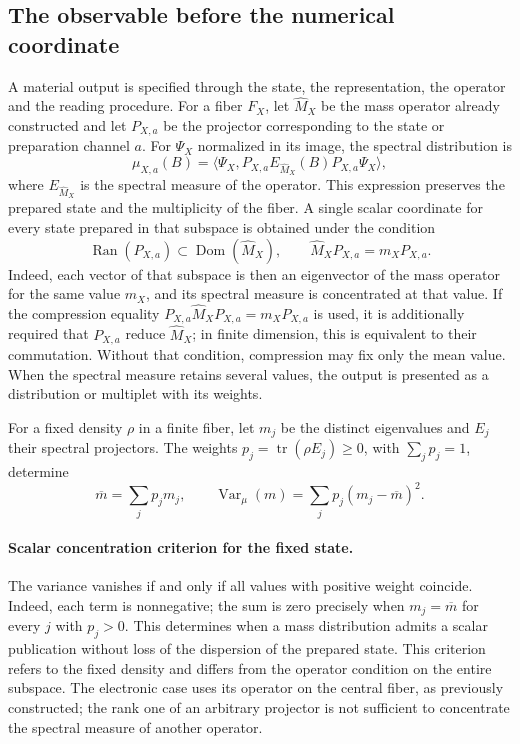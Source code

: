 \subsection{The observable before the numerical coordinate}
\label{vi:subsec:vi-tipos-observable}

A material output is specified through the state, the representation,
the operator and the reading procedure. For a fiber \(F_X\), let
\(\widehat M_X\) be the mass operator already constructed and let \(P_{X,a}\)
be the projector corresponding to the state or preparation channel \(a\).
For \(\Psi_X\) normalized in its image, the spectral distribution is
\[
 \mu_{X,a}(B)
 =\langle\Psi_X,
   P_{X,a}E_{\widehat M_X}(B)P_{X,a}\Psi_X\rangle,
\]
where \(E_{\widehat M_X}\) is the spectral measure of the operator. This
expression preserves the prepared state and the multiplicity of the fiber.
A single scalar coordinate for every state prepared in that subspace
is obtained under the condition
\[
 \operatorname{Ran}(P_{X,a})\subset\operatorname{Dom}(\widehat M_X),
 \qquad \widehat M_XP_{X,a}=m_XP_{X,a}.
\]
Indeed, each vector of that subspace is then an eigenvector of the
mass operator for the same value \(m_X\), and its spectral measure is
concentrated at that value. If the compression equality
\(P_{X,a}\widehat M_XP_{X,a}=m_XP_{X,a}\) is used, it is additionally required that
\(P_{X,a}\) reduce \(\widehat M_X\); in finite dimension, this is equivalent
to their commutation. Without that condition, compression may fix only
the mean value. When the spectral measure retains several values, the
output is presented as a distribution or multiplet with its weights.

For a fixed density \(\rho\) in a finite fiber, let \(m_j\) be
the distinct eigenvalues and \(E_j\) their spectral projectors.
The weights \(p_j=\operatorname{tr}(\rho E_j)\geq0\), with
\(\sum_jp_j=1\), determine
\[
 \overline m=\sum_jp_jm_j,\qquad
 \operatorname{Var}_{\mu}(m)=\sum_jp_j(m_j-\overline m)^2.
\]
\paragraph{Scalar concentration criterion for the fixed state.}
The variance vanishes if and only if all values with positive weight
coincide. Indeed, each term is nonnegative; the sum is zero
precisely when \(m_j=\overline m\) for every \(j\) with
\(p_j>0\). This determines when a mass distribution admits
a scalar publication without loss of the dispersion of the prepared state.
This criterion refers to the fixed density and differs from the operator
condition on the entire subspace. The electronic case uses its
operator on the central fiber, as previously constructed;
the rank one of an arbitrary projector is not sufficient to concentrate the spectral
measure of another operator.


